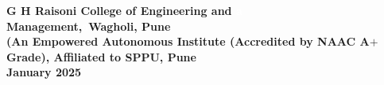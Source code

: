 \begin{center}
{\Large \bf G H Raisoni College of Engineering and \textcolor{white}{a}}\\
\vspace{0.1 in}
{\Large \bf Management,\textcolor{white}{a}Wagholi, Pune} \\
\vspace{.2in}
{\large \bf (An Empowered Autonomous Institute  (Accredited by NAAC A$+$ Grade), Affiliated to SPPU, Pune} \\
\vspace{.2in}
{\small \bf January 2025}\\
\end{center}
